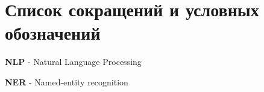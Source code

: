 \chapter*{Список сокращений и условных обозначений}             %

\textbf{NLP} - Natural Language Processing 

\textbf{NER} - Named-entity recognition
